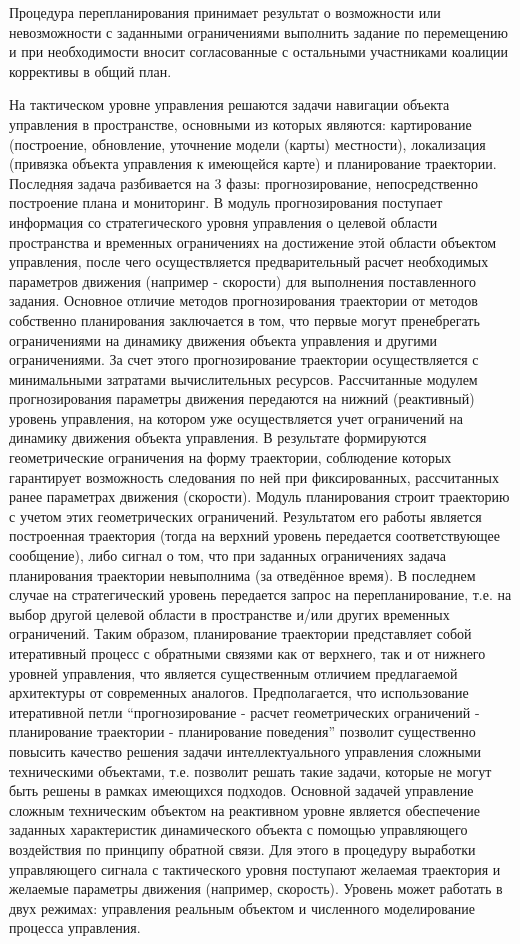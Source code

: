 \documentclass{svjour3}                     %
\begin{document}
Процедура перепланирования принимает результат о возможности или невозможности с заданными ограничениями выполнить задание по перемещению и при необходимости вносит согласованные с остальными участниками коалиции коррективы в общий план.

На тактическом уровне управления решаются задачи навигации объекта управления в пространстве, основными из которых являются: картирование (построение, обновление, уточнение модели (карты) местности), локализация (привязка объекта управления к имеющейся карте) и планирование траектории. Последняя задача разбивается на 3 фазы: прогнозирование, непосредственно построение плана и мониторинг. В модуль прогнозирования поступает информация со стратегического уровня управления о целевой области пространства и временных ограничениях на достижение этой области объектом управления, после чего осуществляется предварительный расчет необходимых параметров движения (например - скорости) для выполнения поставленного задания. Основное отличие методов прогнозирования траектории от методов собственно планирования заключается в том, что первые могут пренебрегать ограничениями на динамику движения объекта управления и другими ограничениями. За счет этого прогнозирование траектории осуществляется с минимальными затратами вычислительных ресурсов. Рассчитанные модулем прогнозирования параметры движения передаются на нижний (реактивный) уровень управления, на котором уже осуществляется учет ограничений на динамику движения объекта управления. В результате формируются геометрические ограничения на форму траектории, соблюдение которых гарантирует возможность следования по ней при фиксированных, рассчитанных ранее параметрах движения (скорости). Модуль планирования строит траекторию с учетом этих геометрических ограничений. Результатом его работы является построенная траектория (тогда на верхний уровень передается соответствующее сообщение), либо сигнал о том, что при заданных ограничениях задача планирования траектории невыполнима (за отведённое время). В последнем случае на стратегический уровень передается запрос на перепланирование, т.е. на выбор другой целевой области в пространстве и/или других временных ограничений. Таким образом, планирование траектории представляет собой итеративный процесс с обратными связями как от верхнего, так и от нижнего уровней управления, что является существенным отличием предлагаемой архитектуры от современных аналогов. Предполагается, что использование итеративной петли “прогнозирование - расчет геометрических ограничений - планирование траектории - планирование поведения” позволит существенно повысить качество решения задачи интеллектуального управления сложными техническими объектами, т.е. позволит решать такие задачи, которые не могут быть решены в рамках имеющихся подходов.
Основной задачей управление сложным техническим объектом на реактивном уровне является обеспечение заданных характеристик динамического объекта с помощью управляющего воздействия по принципу обратной связи. Для этого в процедуру выработки управляющего сигнала с тактического уровня поступают желаемая траектория и желаемые параметры движения (например, скорость). Уровень может работать в двух режимах: управления реальным объектом и численного моделирование процесса управления.
\end{document}
